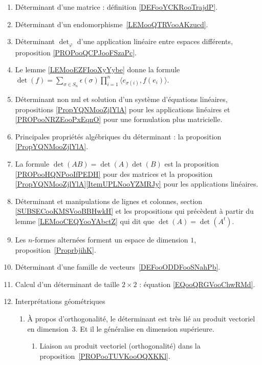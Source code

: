      \label{THMooUXJMooOroxbI}
\begin{enumerate}
	\item
	      Déterminant d'une matrice : définition \ref{DEFooYCKRooTrajdP}.
	\item
	      Déterminant d'un endomorphisme~\ref{LEMooQTRVooAKzucd}.
	\item
	      Déterminant \( \det_{\varphi}\) d'une application linéaire entre espaces différents, proposition \ref{PROPooQCPJooFSzaPc}.
	\item
	      Le lemme \ref{LEMooEZFIooXyYybe} donne la formule \( \det(f)=\sum_{\sigma\in S_n}\epsilon(\sigma)\prod_{i=1}^n\langle e_{\sigma(i)}, f(e_i)\rangle\).
	\item
	      Déterminant non nul et solution d'un système d'équations linéaires, propositions \ref{PropYQNMooZjlYlA} pour les applications linéaires et \ref{PROPooNRZEooPxEqnO} pour une formulation plus matricielle.
	\item
	      Principales propriétés algébriques du déterminant : la proposition \ref{PropYQNMooZjlYlA}.
	\item
	      La formule \( \det(AB)=\det(A)\det(B)\) est la proposition \ref{PROPooHQNPooIfPEDH} pour des matrices et la proposition \ref{PropYQNMooZjlYlA}\ref{ItemUPLNooYZMRJy} pour les applications linéaires.
	\item
	      Déterminant et manipulations de lignes et colonnes, section \ref{SUBSECooKMSVooBBHwkH} et les propositions qui précèdent à partir du lemme \ref{LEMooCEQYooYAbctZ} qui dit que \( \det(A)=\det(A^t)\).
	\item
	      Les \( n\)-formes alternées forment un espace de dimension \( 1\), proposition~\ref{ProprbjihK}.
	\item
	      Déterminant d'une famille de vecteurs~\ref{DEFooODDFooSNahPb}.
	\item
	      Calcul d'un déterminant de taille \( 2\times 2\) : équation \eqref{EQooQRGVooChwRMd}.
	\item
	      Interprétations géométriques
	      \begin{enumerate}
		      \item
		            À propos d'orthogonalité, le déterminant est très lié au produit vectoriel en dimension~\( 3\). Et il le généralise en dimension supérieure.
		            \begin{enumerate}
			            \item
			                  Liaison au produit vectoriel (orthogonalité) dans la proposition~\ref{PROPooTUVKooOQXKKl}.

\end{enumerate}
\end{enumerate}
\end{enumerate}
